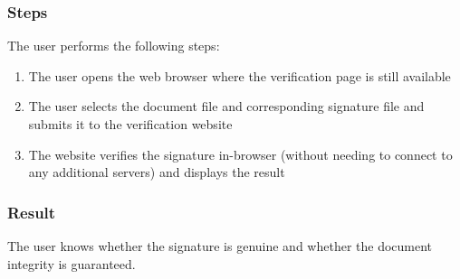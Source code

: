 \subsubsection{Steps}
The user performs the following steps:
\begin{enumerate}
    \item The user opens the web browser where the verification page is still available
    \item The user selects the document file and corresponding signature file and submits it to the verification website
    \item The website verifies the signature in-browser (without needing to connect to any additional servers) and displays the result
\end{enumerate}
\subsubsection{Result}
The user knows whether the signature is genuine and whether the document integrity is guaranteed.
